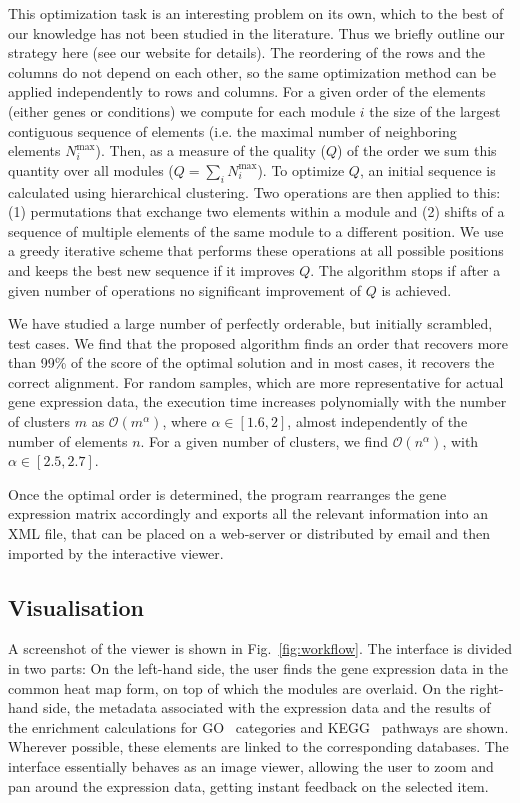 \documentclass[round]{bioinfo}
\begin{document}
This optimization task is an interesting problem on its own, which to
the best of our knowledge has not been studied in the literature. Thus
we briefly outline our strategy here (see our website for details).
The reordering of the rows and the columns do not depend on each
other, so the same optimization method can be applied independently
to rows and columns. For a given order of the
elements (either genes or conditions) we compute for each module $i$ the
size of the largest contiguous sequence of elements (i.e. the maximal
number of neighboring elements $N^\text{max}_i$). Then, as a measure of the
quality ($Q$) of the order we sum this quantity over all modules
($Q=\sum_i N^\text{max}_i$). To optimize $Q$, an initial sequence is calculated using
hierarchical clustering. Two operations are then applied to this: (1)
permutations that exchange two elements within a module and (2) shifts
of a sequence of multiple elements of the same module to a different position. We
use a greedy iterative scheme that performs these operations at
all possible positions and keeps the best new sequence if it improves
$Q$. The algorithm stops if after a given number of operations no
significant improvement of $Q$ is achieved.

We have studied a large number of perfectly orderable, but initially
scrambled, test cases. We find that the proposed algorithm finds an
order that recovers more than 99\% of the score of the optimal
solution and in most cases, it recovers the correct
alignment. For random samples, which are more representative for
actual gene expression data, the execution time increases polynomially
with the number of clusters $m$ as ${\mathcal O}(m^\alpha)$, where
$\alpha \in [1.6, 2]$, almost independently of the number of elements
$n$. For a given number of clusters, we find ${\mathcal O}(n^\alpha)$,
with $\alpha \in [2.5, 2.7]$.

Once the optimal order is determined, the program rearranges the gene
expression matrix accordingly and exports all the relevant information
into an XML file, that can be placed on a web-server or distributed by
email and then imported by the interactive viewer.

\subsection{Visualisation}

A screenshot of the viewer is shown in Fig.~\ref{fig:workflow}. The
interface is divided in two parts: On the left-hand side, the user
finds the gene expression data in the common heat map form, on top of
which the modules are overlaid. On the right-hand side, the metadata
associated with the expression data and the results of the
enrichment calculations for GO~\citep{ashburner00} categories and
KEGG~\citep{kanehisa04} pathways are shown. Wherever possible, these elements
are linked to the corresponding databases. The interface essentially
behaves as an image viewer, allowing the user to zoom and pan around
the expression data, getting instant feedback on the selected
item.
\end{document}
